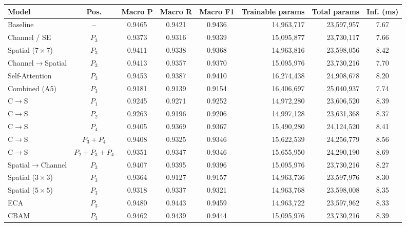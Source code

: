 \documentclass[11pt]{article}
\begin{document}
\begin{center}
\small
\setlength{\tabcolsep}{4pt}
\begin{tabular}{|l|c|c|c|c|r|r|c|}
\hline
Model & Pos. & Macro P & Macro R & Macro F1 & Trainable params & Total params & Inf. (ms)\\
\hline
Baseline & -- & 0.9465 & 0.9421 & 0.9436 & 14{,}963{,}717 & 23{,}597{,}957 & 7.67\\
Channel / SE & $P_3$ & 0.9373 & 0.9316 & 0.9339 & 15{,}095{,}877 & 23{,}730{,}117 & 7.66\\
Spatial ($7{\times}7$) & $P_3$ & 0.9411 & 0.9338 & 0.9368 & 14{,}963{,}816 & 23{,}598{,}056 & 8.42\\
Channel$\rightarrow$Spatial & $P_3$ & 0.9413 & 0.9357 & 0.9370 & 15{,}095{,}976 & 23{,}730{,}216 & 7.70\\
Self-Attention & $P_3$ & 0.9453 & 0.9387 & 0.9410 & 16{,}274{,}438 & 24{,}908{,}678 & 8.20\\
Combined (A5) & $P_3$ & 0.9181 & 0.9139 & 0.9154 & 16{,}406{,}697 & 25{,}040{,}937 & 7.74\\
C$\rightarrow$S & $P_1$ & 0.9245 & 0.9271 & 0.9252 & 14{,}972{,}280 & 23{,}606{,}520 & 8.39\\
C$\rightarrow$S & $P_2$ & 0.9263 & 0.9196 & 0.9206 & 14{,}997{,}128 & 23{,}631{,}368 & 8.37\\
C$\rightarrow$S & $P_4$ & 0.9405 & 0.9369 & 0.9367 & 15{,}490{,}280 & 24{,}124{,}520 & 8.41\\
C$\rightarrow$S & $P_3{+}P_4$ & 0.9408 & 0.9325 & 0.9346 & 15{,}622{,}539 & 24{,}256{,}779 & 8.56\\
C$\rightarrow$S & $P_2{+}P_3{+}P_4$ & 0.9351 & 0.9347 & 0.9346 & 15{,}655{,}950 & 24{,}290{,}190 & 8.69\\
Spatial$\rightarrow$Channel & $P_3$ & 0.9407 & 0.9395 & 0.9396 & 15{,}095{,}976 & 23{,}730{,}216 & 8.27\\
Spatial ($3{\times}3$) & $P_3$ & 0.9364 & 0.9127 & 0.9157 & 14{,}963{,}736 & 23{,}597{,}976 & 8.30\\
Spatial ($5{\times}5$) & $P_3$ & 0.9318 & 0.9337 & 0.9321 & 14{,}963{,}768 & 23{,}598{,}008 & 8.35\\
ECA & $P_3$ & 0.9480 & 0.9443 & 0.9459 & 14{,}963{,}722 & 23{,}597{,}962 & 8.33\\
CBAM & $P_3$ & 0.9462 & 0.9439 & 0.9444 & 15{,}095{,}976 & 23{,}730{,}216 & 8.39\\
\hline
\end{tabular}
\end{center}
\end{document}
